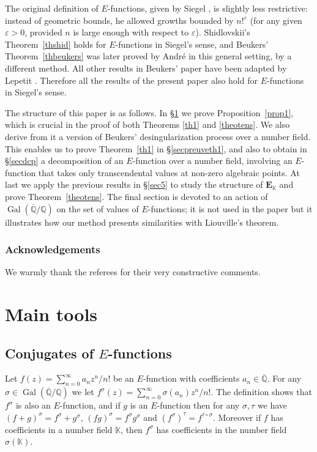 \documentclass[11pt]{article}
\numberwithin{equation}{section}
\newcommand{\Efunction}{$E$\nobreakdash-func\-tion\xspace}
\newcommand{\Efunctions}{$E$\nobreakdash-func\-tions\xspace}
\theoremstyle{definition}
\newcommand{\Q}{\mathbb{Q}}
\newcommand{\K}{\mathbb{K}}
\newcommand{\EE}{{\mathbf E}}
\newcommand{\Qbar}{\overline{\mathbb Q}}
\newcommand{\EK}{\EE_{\K}}
\DeclareMathOperator{\Gal}{Gal}
\begin{document}
The original definition of \Efunctions, given by Siegel \cite{siegel}, is slightly less restrictive:
instead of geometric bounds,
he allowed growths bounded by $n!^{\varepsilon}$ (for any given $\varepsilon>0$, provided $n$ is large enough with respect to $\varepsilon$).
Shidlovskii's Theorem~\ref{thshid} holds for \Efunctions in Siegel's sense, and
Beukers' Theorem~\ref{thbeukers} was later proved by André \cite{andreasens} in this general setting, by a different method. All other results in Beukers' paper \cite{beukers} have been adapted by Lepetit \cite{lepetit}. Therefore all the results of the present paper also hold for \Efunctions in Siegel's sense.

The structure of this paper is as follows. In \S \ref{sec2} we prove Proposition~\ref{prop1},
which is crucial in the proof of both Theorems \ref{th1} and \ref{theotens}. We also derive from it
a version of Beukers' desingularization process over a number field. This enables us to prove Theorem~\ref{th1} in \S \ref{secpreuveth1}, and also to obtain in \S \ref{secdcp} a decomposition of an \Efunction over a number field, involving an \Efunction that takes only transcendental values at non-zero algebraic points. At last we apply the previous results in \S \ref{sec5} to study the structure of $\EK$ and prove Theorem~\ref{theotens}.
The final section is devoted to an action of $\Gal(\Qbar/\Q)$ on the set of values of \Efunctions; it is not used in the paper but it illustrates how our method presents similarities with Liouville's theorem.

\subsubsection*{Acknowledgements}
We warmly thank the referees for their very constructive comments.

\section{Main tools}\label{sec2}

\subsection{Conjugates of \Efunctions} \label{ssec:conjugates}

Let $f(z) = \sum_{n=0}^\infty a_n z^n/n!$ be an \Efunction with coefficients $a_n\in\Qbar$. For any $\sigma \in\Gal(\Qbar/\Q)$ we let $f^\sigma(z) = \sum_{n=0}^\infty \sigma(a_n) z^n/n!$. The definition shows that $f^\sigma$ is also an \Efunction, and if $g$ is an \Efunction then for any $\sigma ,\tau$ we have
$(f+g)^\sigma = f^\sigma+g^\sigma$, $ (f g)^\sigma = f^\sigma g^\sigma$ and $(f^\sigma )^\tau = f^{\tau\circ\sigma}$. Moreover if $f$ has coefficients in a number field $\K$, then $f^\sigma$ has coefficients in the number field $\sigma(\K)$.
\end{document}

